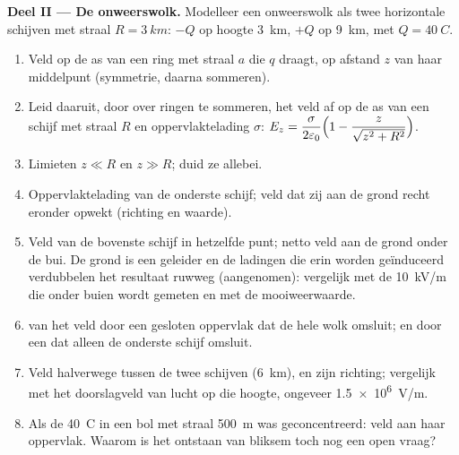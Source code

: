 \begin{problem}
\medskip
\noindent\textbf{Deel II --- De onweerswolk.}
Modelleer een onweerswolk als twee horizontale schijven met straal $R = \qty{3}{km}$:
$-Q$ op hoogte \qty{3}{km}, $+Q$ op \qty{9}{km}, met $Q = \qty{40}{C}$.
\begin{enumerate}[resume]
  \item Veld op de as van een ring met straal $a$ die $q$ draagt, op
        afstand $z$ van haar middelpunt (symmetrie, daarna sommeren).
  \item Leid daaruit, door over ringen te sommeren, het veld af op de as van een schijf
        met straal $R$ en oppervlaktelading $\sigma$:
        $E_z = \dfrac{\sigma}{2\varepsilon_0}\Bigl(1 - \dfrac{z}{\sqrt{z^2 + R^2}}\Bigr)$.
  \item Limieten $z \ll R$ en $z \gg R$; duid ze allebei.
  \item Oppervlaktelading van de onderste schijf; veld dat zij aan de grond
        recht eronder opwekt (richting en waarde).
  \item Veld van de bovenste schijf in hetzelfde punt; netto veld aan de
        grond onder de bui. De grond is een geleider en de ladingen die erin worden
        geïnduceerd verdubbelen het resultaat ruwweg (aangenomen): vergelijk met de
        \qty{10}{kV/m} die onder buien wordt gemeten en met de mooiweerwaarde.
  \item {} van het veld door een gesloten oppervlak dat de hele
        wolk omsluit; en door een dat alleen de onderste schijf omsluit.
  \item Veld halverwege tussen de twee schijven (\qty{6}{km}), en zijn
        richting; vergelijk met het doorslagveld van lucht op die
        hoogte, ongeveer \qty{1.5e6}{V/m}.
  \item Als de \qty{40}{C} in een bol met straal \qty{500}{m} was
        geconcentreerd: veld aan haar oppervlak. Waarom is het ontstaan van bliksem
        toch nog een open vraag?
\end{enumerate}


\end{problem}
